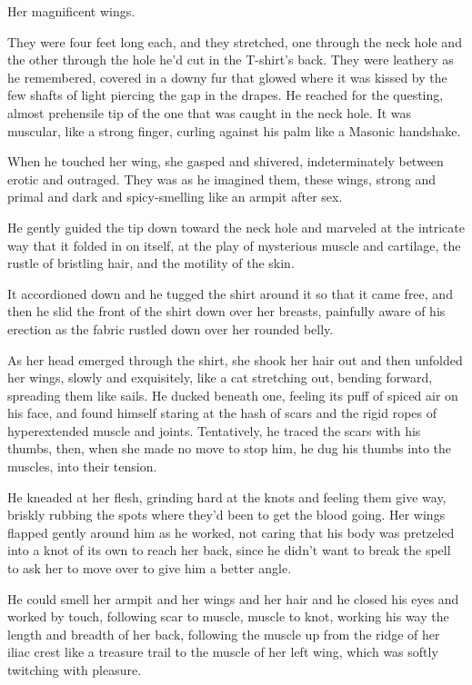 \documentclass{article}
\begin{document}
Her magnificent wings.

They were four feet long each, and they stretched, one through the
neck hole and the other through the hole he'd cut in the T-shirt's
back.  They were leathery as he remembered, covered in a downy fur
that glowed where it was kissed by the few shafts of light piercing
the gap in the drapes.  He reached for the questing, almost prehensile
tip of the one that was caught in the neck hole.  It was muscular,
like a strong finger, curling against his palm like a Masonic
handshake.

When he touched her wing, she gasped and shivered, indeterminately
between erotic and outraged.  They was as he imagined them, these
wings, strong and primal and dark and spicy-smelling like an armpit
after sex.

He gently guided the tip down toward the neck hole and marveled at the
intricate way that it folded in on itself, at the play of mysterious
muscle and cartilage, the rustle of bristling hair, and the motility
of the skin.

It accordioned down and he tugged the shirt around it so that it came
free, and then he slid the front of the shirt down over her breasts,
painfully aware of his erection as the fabric rustled down over her
rounded belly.

As her head emerged through the shirt, she shook her hair out and then
unfolded her wings, slowly and exquisitely, like a cat stretching out,
bending forward, spreading them like sails.  He ducked beneath one,
feeling its puff of spiced air on his face, and found himself staring
at the hash of scars and the rigid ropes of hyperextended muscle and
joints.  Tentatively, he traced the scars with his thumbs, then, when
she made no move to stop him, he dug his thumbs into the muscles, into
their tension.

He kneaded at her flesh, grinding hard at the knots and feeling them
give way, briskly rubbing the spots where they'd been to get the blood
going.  Her wings flapped gently around him as he worked, not caring
that his body was pretzeled into a knot of its own to reach her back,
since he didn't want to break the spell to ask her to move over to
give him a better angle.

He could smell her armpit and her wings and her hair and he closed his
eyes and worked by touch, following scar to muscle, muscle to knot,
working his way the length and breadth of her back, following the
muscle up from the ridge of her iliac crest like a treasure trail to
the muscle of her left wing, which was softly twitching with pleasure.
\end{document}
